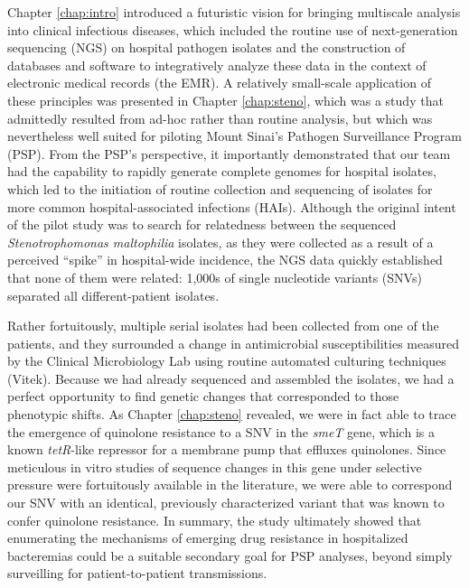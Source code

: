Chapter \ref{chap:intro} introduced a futuristic vision for bringing multiscale analysis into clinical infectious diseases, which included the routine use of next-generation sequencing (NGS) on hospital pathogen isolates and the construction of databases and software to integratively analyze these data in the context of electronic medical records (the EMR). A relatively small-scale application of these principles was presented in Chapter \ref{chap:steno}, which was a study that admittedly resulted from ad-hoc rather than routine analysis, but which was nevertheless well suited for piloting Mount Sinai's Pathogen Surveillance Program (PSP). From the PSP's perspective, it importantly demonstrated that our team had the capability to rapidly generate complete genomes for hospital isolates, which led to the initiation of routine collection and sequencing of isolates for more common hospital-associated infections (HAIs). Although the original intent of the pilot study was to search for relatedness between the sequenced \emph{Stenotrophomonas maltophilia} isolates, as they were collected as a result of a perceived ``spike'' in hospital-wide incidence, the NGS data quickly established that none of them were related: 1,000s of single nucleotide variants (SNVs) separated all different-patient isolates.

Rather fortuitously, multiple serial isolates had been collected from one of the patients, and they surrounded a change in antimicrobial susceptibilities measured by the Clinical Microbiology Lab using routine automated culturing techniques (Vitek). Because we had already sequenced and assembled the isolates, we had a perfect opportunity to find genetic changes that corresponded to those phenotypic shifts. As Chapter \ref{chap:steno} revealed, we were in fact able to trace the emergence of quinolone resistance to a SNV in the \emph{smeT} gene, which is a known \emph{tetR}-like repressor for a membrane pump that effluxes quinolones. Since meticulous in vitro studies of sequence changes in this gene under selective pressure were fortuitously available in the literature,\autocite{Alonso1997,Sanchez2002} we were able to correspond our SNV with an identical, previously characterized variant that was known to confer quinolone resistance. In summary, the study ultimately showed that enumerating the mechanisms of emerging drug resistance in hospitalized bacteremias could be a suitable secondary goal for PSP analyses, beyond simply surveilling for patient-to-patient transmissions.

